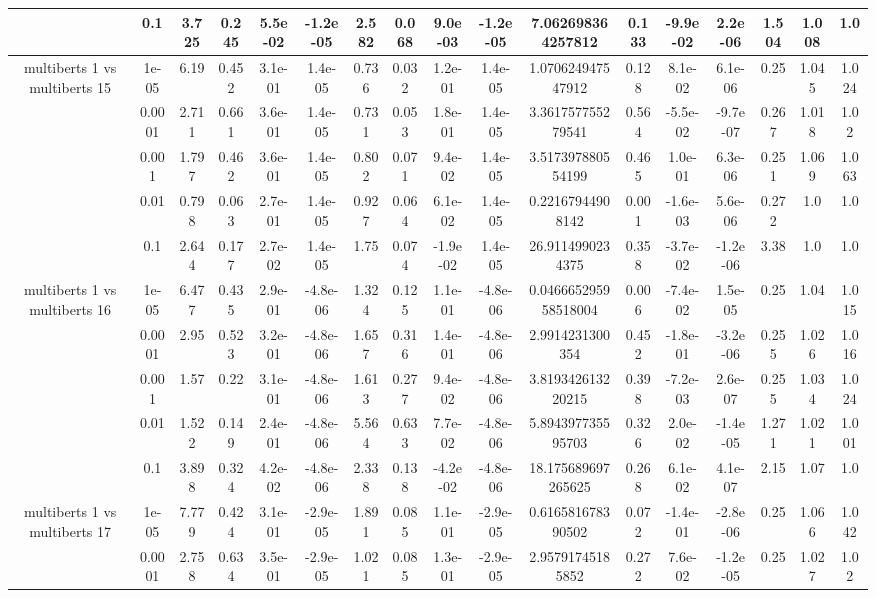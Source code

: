 \begin{tabular}{|c|c|c|c|c|c|c|c|c|c|c|c|c|c|c|c|c|}
 & 0.1 & 3.725 & 0.245 & 5.5e-02 & -1.2e-05 & 2.582 & 0.068 & 9.0e-03 & -1.2e-05 & 7.062698364257812 & 0.133 & -9.9e-02 & 2.2e-06 & 1.504 & 1.008 & 1.0 \\
\hline
\multirow{5}{*}{multiberts 1 vs multiberts 15} & 1e-05 & 6.19 & 0.452 & 3.1e-01 & 1.4e-05 & 0.736 & 0.032 & 1.2e-01 & 1.4e-05 & 1.070624947547912 & 0.128 & 8.1e-02 & 6.1e-06 & 0.25 & 1.045 & 1.024 \\
 & 0.0001 & 2.711 & 0.661 & 3.6e-01 & 1.4e-05 & 0.731 & 0.053 & 1.8e-01 & 1.4e-05 & 3.361757755279541 & 0.564 & -5.5e-02 & -9.7e-07 & 0.267 & 1.018 & 1.02 \\
 & 0.001 & 1.797 & 0.462 & 3.6e-01 & 1.4e-05 & 0.802 & 0.071 & 9.4e-02 & 1.4e-05 & 3.517397880554199 & 0.465 & 1.0e-01 & 6.3e-06 & 0.251 & 1.069 & 1.063 \\
 & 0.01 & 0.798 & 0.063 & 2.7e-01 & 1.4e-05 & 0.927 & 0.064 & 6.1e-02 & 1.4e-05 & 0.22167944908142 & 0.001 & -1.6e-03 & 5.6e-06 & 0.272 & 1.0 & 1.0 \\
 & 0.1 & 2.644 & 0.177 & 2.7e-02 & 1.4e-05 & 1.75 & 0.074 & -1.9e-02 & 1.4e-05 & 26.9114990234375 & 0.358 & -3.7e-02 & -1.2e-06 & 3.38 & 1.0 & 1.0 \\
\hline
\multirow{5}{*}{multiberts 1 vs multiberts 16} & 1e-05 & 6.477 & 0.435 & 2.9e-01 & -4.8e-06 & 1.324 & 0.125 & 1.1e-01 & -4.8e-06 & 0.046665295958518004 & 0.006 & -7.4e-02 & 1.5e-05 & 0.25 & 1.04 & 1.015 \\
 & 0.0001 & 2.95 & 0.523 & 3.2e-01 & -4.8e-06 & 1.657 & 0.316 & 1.4e-01 & -4.8e-06 & 2.9914231300354 & 0.452 & -1.8e-01 & -3.2e-06 & 0.255 & 1.026 & 1.016 \\
 & 0.001 & 1.57 & 0.22 & 3.1e-01 & -4.8e-06 & 1.613 & 0.277 & 9.4e-02 & -4.8e-06 & 3.819342613220215 & 0.398 & -7.2e-03 & 2.6e-07 & 0.255 & 1.034 & 1.024 \\
 & 0.01 & 1.522 & 0.149 & 2.4e-01 & -4.8e-06 & 5.564 & 0.633 & 7.7e-02 & -4.8e-06 & 5.894397735595703 & 0.326 & 2.0e-02 & -1.4e-05 & 1.271 & 1.021 & 1.001 \\
 & 0.1 & 3.898 & 0.324 & 4.2e-02 & -4.8e-06 & 2.338 & 0.138 & -4.2e-02 & -4.8e-06 & 18.175689697265625 & 0.268 & 6.1e-02 & 4.1e-07 & 2.15 & 1.07 & 1.0 \\
\hline
\multirow{5}{*}{multiberts 1 vs multiberts 17} & 1e-05 & 7.779 & 0.424 & 3.1e-01 & -2.9e-05 & 1.891 & 0.085 & 1.1e-01 & -2.9e-05 & 0.616581678390502 & 0.072 & -1.4e-01 & -2.8e-06 & 0.25 & 1.066 & 1.042 \\
 & 0.0001 & 2.758 & 0.634 & 3.5e-01 & -2.9e-05 & 1.021 & 0.085 & 1.3e-01 & -2.9e-05 & 2.95791745185852 & 0.272 & 7.6e-02 & -1.2e-05 & 0.25 & 1.027 & 1.02 \\

\end{tabular}
